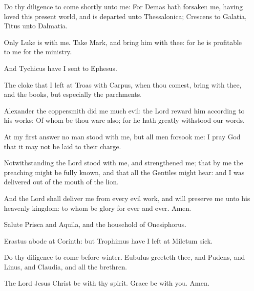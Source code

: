 \verse Do thy diligence to come shortly unto me: \verse For Demas hath forsaken me, having loved this present world, and is departed unto Thessalonica; Crescens to Galatia, Titus unto Dalmatia.

\verse Only Luke is with me. Take Mark, and bring him with thee: for he is profitable to me for the ministry.

\verse And Tychicus have I sent to Ephesus.

\verse The cloke that I left at Troas with Carpus, when thou comest, bring with thee, and the books, but especially the parchments.

\verse Alexander the coppersmith did me much evil: the Lord reward him according to his works: \verse Of whom be thou ware also; for he hath greatly withstood our words.

\verse At my first answer no man stood with me, but all men forsook me: I pray God that it may not be laid to their charge.

\verse Notwithstanding the Lord stood with me, and strengthened me; that by me the preaching might be fully known, and that all the Gentiles might hear: and I was delivered out of the mouth of the lion.

\verse And the Lord shall deliver me from every evil work, and will preserve me unto his heavenly kingdom: to whom be glory for ever and ever. Amen.

\verse Salute Prisca and Aquila, and the household of Onesiphorus.

\verse Erastus abode at Corinth: but Trophimus have I left at Miletum sick.

\verse Do thy diligence to come before winter. Eubulus greeteth thee, and Pudens, and Linus, and Claudia, and all the brethren.

\verse The Lord Jesus Christ be with thy spirit. Grace be with you.  Amen.

